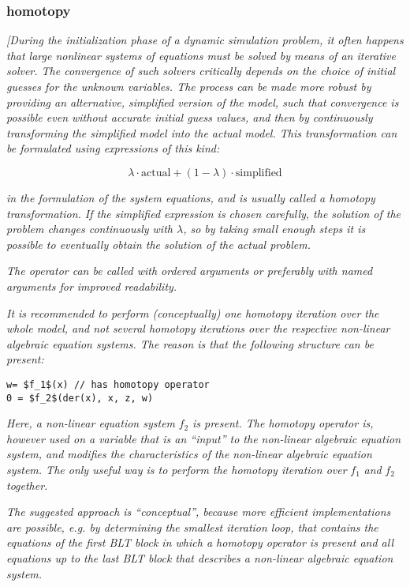 \subsubsection{homotopy}

\emph{{[}During the initialization phase of a dynamic simulation
problem, it often happens that large nonlinear systems of equations must
be solved by means of an iterative solver. The convergence of such
solvers critically depends on the choice of initial guesses for the
unknown variables. The process can be made more robust by providing an
alternative, simplified version of the model, such that convergence is
possible even without accurate initial guess values, and then by
continuously transforming the simplified model into the actual model.
This transformation can be formulated using expressions of this kind:}

$$\lambda\cdot\text{actual} + (1-\lambda)\cdot\text{simplified}$$

\emph{in the formulation of the system equations, and is usually called
a homotopy transformation. If the simplified expression is chosen
carefully, the solution of the problem changes continuously with $\lambda$,
so by taking small enough steps it is possible to eventually obtain the
solution of the actual problem.}

\emph{The operator can be called with ordered arguments or preferably
with named arguments for improved readability.}

\emph{It is recommended to perform (conceptually) one homotopy iteration
over the whole model, and not several homotopy iterations over the
respective non-linear algebraic equation systems. The reason is that the
following structure can be present:}

\begin{lstlisting}[language=modelica, mathescape=true]
w= $f_1$(x) // has homotopy operator
0 = $f_2$(der(x), x, z, w)
\end{lstlisting}

\emph{Here, a non-linear equation system} $f_2$
\emph{is present. The homotopy operator is, however used on a variable
that is an ``input'' to the non-linear algebraic equation system, and
modifies the characteristics of the non-linear algebraic equation
system. The only useful way is to perform the homotopy iteration over}
$f_1$ \emph{and} $f_2$
\emph{together.}

\emph{The suggested approach is ``conceptual'', because more efficient
implementations are possible, e.g. by determining the smallest iteration
loop, that contains the equations of the first BLT block in which a
homotopy operator is present and all equations up to the last BLT block
that describes a non-linear algebraic equation system.}

